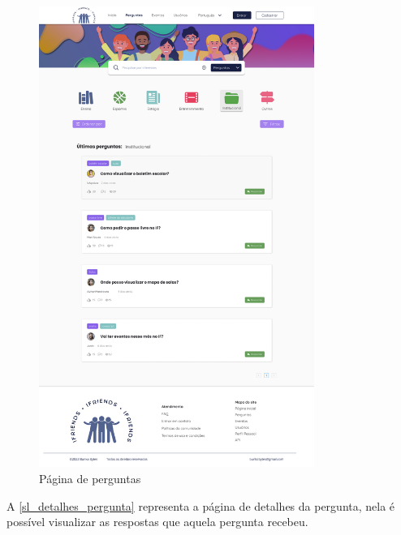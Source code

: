 \begin{figure}[htb]
\centering
\caption{\label{sl_perguntas} Página de perguntas}
\includegraphics[width=0.8\textwidth]{anexos/Imagens_Prototipo/sem_login/perguntas.png}
\end{figure}
\FloatBarrier

A \autoref{sl_detalhes_pergunta} representa a página de detalhes da pergunta, nela é possível visualizar as respostas que aquela pergunta recebeu.

